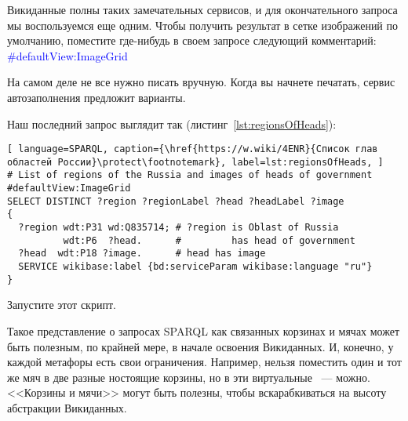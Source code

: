 Викиданные полны таких замечательных сервисов, и для окончательного запроса мы воспользуемся еще одним. Чтобы получить результат в сетке изображений по умолчанию, поместите где-нибудь в своем запросе следующий комментарий: \textcolor{blue}{\#defaultView:ImageGrid}

На самом деле не все нужно писать вручную. Когда вы начнете печатать, сервис автозаполнения предложит варианты.

\newpage
Наш последний запрос выглядит так (листинг~\ref{lst:regionsOfHeads}): 

\begin{lstlisting}[ language=SPARQL, caption={\href{https://w.wiki/4ENR}{Список глав областей России}\protect\footnotemark}, label=lst:regionsOfHeads, ]
# List of regions of the Russia and images of heads of government
#defaultView:ImageGrid
SELECT DISTINCT ?region ?regionLabel ?head ?headLabel ?image
{
  ?region wdt:P31 wd:Q835714; # ?region is Oblast of Russia
          wdt:P6  ?head.      #         has head of government
  ?head  wdt:P18 ?image.      # head has image
  SERVICE wikibase:label {bd:serviceParam wikibase:language "ru"} 
}
\end{lstlisting}

Запустите этот скрипт.

Такое представление о запросах SPARQL как связанных корзинах и мячах может быть полезным, по крайней мере, в начале освоения Викиданных. И, конечно, у каждой метафоры есть свои ограничения. Например, нельзя поместить один и тот же мяч в две разные ностоящие корзины, но в эти виртуальные ~--- можно. <<Корзины и мячи>> могут быть полезны, чтобы вскарабкиваться на высоту абстракции Викиданных.